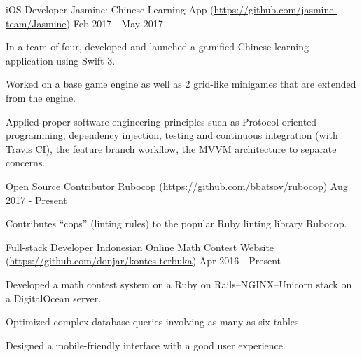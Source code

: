 

\begin{cventries}

  \cventry
  {iOS Developer} %
  {Jasmine: Chinese Learning App (\url{https://github.com/jasmine-team/Jasmine})} %
  {} %
  {Feb 2017 - May 2017} %
  {
    \begin{cvitems} %
    \item {In a team of four, developed and launched a gamified Chinese learning application using Swift 3.}
    \item {Worked on a base game engine as well as 2 grid-like minigames that are extended from the engine.}
    \item {Applied proper software engineering principles such as Protocol-oriented programming, dependency injection, testing and continuous integration (with Travis CI), the feature branch workflow, the MVVM architecture to separate concerns.}
    \end{cvitems}
  }

  \cventry
  {Open Source Contributor} %
  {Rubocop (\url{https://github.com/bbatsov/rubocop})} %
  {} %
  {Aug 2017 - Present} %
  {
    \begin{cvitems} %
    \item {Contributes ``cops'' (linting rules) to the popular Ruby linting library Rubocop.}
    \end{cvitems}
  }

  \cventry
  {Full-stack Developer} %
  {Indonesian Online Math Contest Website (\url{https://github.com/donjar/kontes-terbuka})} %
  {} %
  {Apr 2016 - Present} %
  {
    \begin{cvitems} %
    \item {Developed a math contest system on a Ruby on Rails--NGINX--Unicorn stack on a DigitalOcean server.}
    \item {Optimized complex database queries involving as many as six tables.}
    \item {Designed a mobile-friendly interface with a good user experience.}
    \end{cvitems}
  }

\end{cventries}

